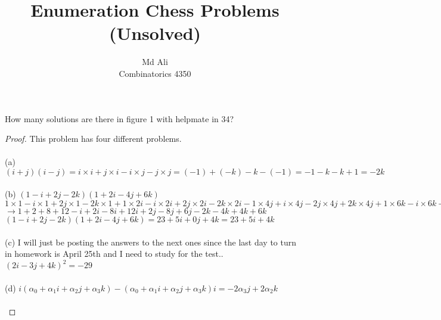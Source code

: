 \documentclass[12pt]{article}
\newenvironment{problem}[2][Problem]{\begin{trivlist}
\item[\hskip \labelsep {\bfseries #1}\hskip \labelsep {\bfseries #2.}]}{\end{trivlist}}
\begin{document}
 
 
\title{Enumeration Chess Problems (Unsolved)}%
\author{Md Ali\\ %
Combinatorics 4350} %
 
\maketitle
 
\begin{problem}{1} %
How many solutions are there in figure 1 with helpmate in 34?

\end{problem}
 
\begin{proof}
This problem has four different problems. \\ \\
(a) $(i+j)(i-j) = i \times i + j \times i - i \times j - j\times j = (-1)+(-k)-k-(-1) = -1-k-k+1 = -2k$ \\ \\
(b) $(1-i+2j-2k)(1+2i-4j+6k)$ \\ 
$1\times 1 - i\times 1+2j \times 1 -2k \times 1+ 1\times 2i -i\times 2i+2j \times 2i -2k \times 2i -1 \times 4j +i\times 4j -2j \times 4j + 2k \times 4j+ 1\times 6k- i\times 6k+2j\times 6k-2k\times 6k$ \\ 
$\rightarrow 1 + 2 +8 + 12 - i + 2i-8i +12i + 2j -8j +6j -2k-4k+4k+6k$ \\ 
 $(1-i+2j-2k)(1+2i-4j+6k) = 23 + 5i +0j +4k = 23 + 5i + 4k$ \\ \\ 
 (c) I will just be posting the answers to the next ones since the last day to turn in homework is April 25th and I need to study for the test.. \\
 $(2i-3j+4k)^2 = -29$ \\ \\
 (d) $i(\alpha_0 + \alpha_1i +\alpha_2j +\alpha_3k)-(\alpha_0 + \alpha_1i +\alpha_2j +\alpha_3k)i = -2 \alpha_3 j + 2 \alpha_2k$ \\ \\
\end{proof}
\end{document}
